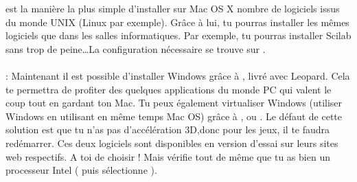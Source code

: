



\noindent{} est la manière la plus simple d'installer sur Mac OS X nombre de logiciels issus du monde UNIX (Linux par exemple). Grâce à lui, tu pourras installer les mêmes logiciels que dans les salles informatiques. Par exemple, tu pourras installer Scilab sans trop de peine\dots La configuration nécessaire se trouve sur . \\ \\

\noindent {} : Maintenant il est possible d'installer Windows grâce à , livré avec Leopard. Cela te permettra de profiter des quelques applications du monde PC qui valent le coup tout en gardant ton Mac. Tu peux également virtualiser Windows (utiliser Windows en utilisant en même temps Mac OS) grâce à ,  ou . Le  défaut de cette solution est que tu n'as pas d'accélération 3D,donc pour les jeux, il te faudra redémarrer. Ces deux logiciels sont disponibles en version d'essai sur leurs sites web respectifs. A toi de choisir !
Mais vérifie tout de même que tu as bien un processeur Intel ( puis sélectionne ).
